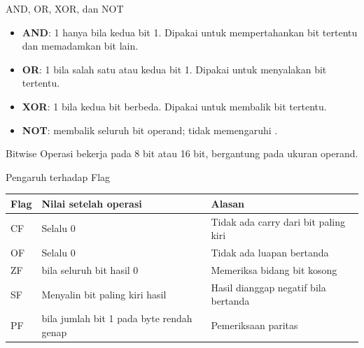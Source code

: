 \documentclass[aspectratio=169,11pt]{beamer}
\begin{document}
\begin{frame}{AND, OR, XOR, dan NOT}
\small
\begin{itemize}
    \item \textbf{AND}: 1 hanya bila kedua bit 1. Dipakai untuk
          mempertahankan bit tertentu dan memadamkan bit lain.

    \vspace{0.18em}
    \item \textbf{OR}: 1 bila salah satu atau kedua bit 1. Dipakai
          untuk menyalakan bit tertentu.

    \vspace{0.18em}
    \item \textbf{XOR}: 1 bila kedua bit berbeda. Dipakai untuk
          membalik bit tertentu.

    \vspace{0.18em}
    \item \textbf{NOT}: membalik seluruh bit operand; tidak
          memengaruhi .
\end{itemize}

\vspace{0.2em}
\begin{block}{Bitwise}
\small Operasi bekerja pada 8 bit atau 16 bit, bergantung pada
ukuran operand.
\end{block}
\end{frame}

\begin{frame}{Pengaruh terhadap Flag}
\footnotesize
\begin{center}
\begin{tabular}{@{}>{\raggedright\arraybackslash}p{1.6cm}
    >{\raggedright\arraybackslash}p{5.0cm}
    >{\raggedright\arraybackslash}p{6.2cm}@{}}
    \toprule
    \textbf{Flag} & \textbf{Nilai setelah operasi} &
    \textbf{Alasan} \\
    \midrule
    CF & Selalu 0 & Tidak ada carry dari bit paling kiri \\
    \addlinespace
    OF & Selalu 0 & Tidak ada luapan bertanda \\
    \addlinespace
    ZF & 1 bila seluruh bit hasil 0 & Memeriksa bidang bit kosong \\
    \addlinespace
    SF & Menyalin bit paling kiri hasil & Hasil dianggap negatif
    bila bertanda \\
    \addlinespace
    PF & 1 bila jumlah bit 1 pada byte rendah genap & Pemeriksaan
    paritas \\
    \bottomrule
\end{tabular}
\end{center}
\end{frame}
\end{document}
